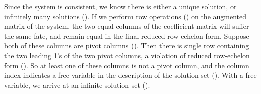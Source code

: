 Since the system is consistent, we know there is either a unique solution, or infinitely many solutions ().  If we perform row operations () on the augmented matrix of the system, the two equal columns of the coefficient matrix will suffer the same fate, and remain equal in the final reduced row-echelon form.  Suppose both of these columns are pivot columns ().  Then there is single row containing the two leading 1's of the two pivot columns, a violation of reduced row-echelon form ().  So at least one of these columns is not a pivot column, and the column index indicates a free variable in the description of the solution set ().  With a free variable, we arrive at an infinite solution set ().